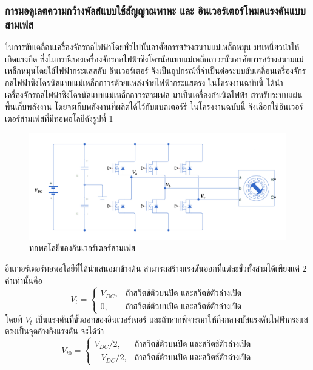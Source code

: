 \documentclass[11pt,a4paper]{article}
\begin{document}
\subsubsection{การมอดูเลตความกว้างพัลส์แบบใช้สัญญาณพาหะ และ อินเวอร์เตอร์โหมดแรงดันแบบสามเฟส}
ในการขับเคลื่อนเครื่องจักรกลไฟฟ้าโดยทั่วไปนั้นอาศัยการสร้างสนามแม่เหล็กหมุน มาเหนี่ยวนำให้เกิดแรงบิด ซึ่งในกรณีของเครื่องจักรกลไฟฟ้าซิงโครนัสแบบแม่เหล็กถาวรนั้นอาศัยการสร้างสนามแม่เหล็กหมุนโดยใช้ไฟฟ้ากระแสสลับ อินเวอร์เตอร์ จึงเป็นอุปกรณ์ที่จำเป็นต่อระบบขับเคลื่อนเครื่องจักรกลไฟฟ้าซิงโครนัสแบบแม่เหล็กถาวรด้วยแหล่งจ่ายไฟฟ้ากระแสตรง ในโครงงานฉบับนี้ ได้นำเครื่องจักรกลไฟฟ้าซิงโครนัสแบบแม่เหล็กถาวรสามเฟส มาเป็นเครื่องกำเนิดไฟฟ้า สำหรับระบบแผ่นพื้นเก็บพลังงาน โดยจะเก็บพลังงานที่ผลิตได้ไว้กับแบตเตอร์รี ในโครงงานฉบับนี้ จึงเลือกใช้อินเวอร์เตอร์สามเฟสที่มีทอพอโลยีดังรูปที่ \ref{3phaseinv}
\begin{figure}[!h]
    \centering
    \includegraphics[width=\textwidth]{inverter_topology.png}
    \caption{ทอพอโลยีของอินเวอร์เตอร์สามเฟส}
    \label{3phaseinv}
\end{figure}

อินเวอร์เตอร์ทอพอโลยีที่ได้นำเสนอมาข้างต้น สามารถสร้างแรงดันออกที่แต่ละขั้วทั้งสามได้เพียงแค่ 2 ค่าเท่านั้นคือ
\begin{equation}
    V_t = \begin{cases}
        V_{DC}, & \text{ถ้าสวิตช์ตัวบนปิด และสวิตช์ตัวล่างเปิด} \\
        0,      & \text{ถ้าสวิตช์ตัวบนปิด และสวิตช์ตัวล่างเปิด}
    \end{cases}
\end{equation}
โดยที่ $V_t$ เป็นแรงดันที่ขั้วออกของอินเวอร์เตอร์
และถ้าหากพิจารณาให้กึ่งกลางบัสแรงดันไฟฟ้ากระแสตรงเป็นจุดอ้างอิงแรงดัน จะได้ว่า
\begin{equation}
    V_{t0} = \begin{cases}
        V_{DC}/2,  & \text{ถ้าสวิตช์ตัวบนปิด และสวิตช์ตัวล่างเปิด} \\
        -V_{DC}/2, & \text{ถ้าสวิตช์ตัวบนปิด และสวิตช์ตัวล่างเปิด}
    \end{cases}
\end{equation}
\end{document}
